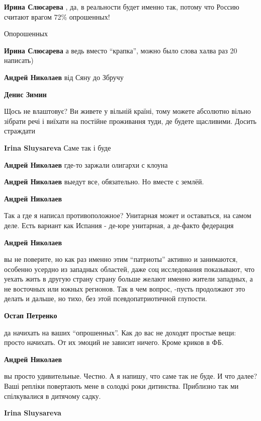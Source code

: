 \begin{itemize}
\begin{itemize}
\textbf{Ирина Слюсарева} , да, в реальности будет именно так, потому что Россию считают врагом 72\% опрошенных!

Опорошенных

\textbf{Ирина Слюсарева} а ведь вместо \enquote{крапка}, можно было слова халва раз 20 написать)

\textbf{Андрей Николаев} від Сяну до Збручу

\textbf{Денис Зимин} 

Щось не влаштовує? Ви живете у вільній країні, тому можете абсолютно вільно
зібрати речі і виїхати на постійне проживання туди, де будете щасливими. Досить
страждати


\textbf{Irina Sluysareva} Саме так і буде

\textbf{Андрей Николаев} где-то заржали олигархи с клоуна

\textbf{Андрей Николаев} выедут все, обязательно.
Но вместе с землёй.

\textbf{Андрей Николаев} 

Так а где я написал противоположное? Унитарная может и оставаться, на самом
деле. Есть вариант как Испания - де-юре унитарная, а де-факто федерация

\textbf{Андрей Николаев} 

вы не поверите, но как раз именно этим \enquote{патриоты} активно и занимаются,
особенно усердно из западных областей, даже соц исследования показывают, что
уехать жить в другую страну страну больше желают именно жители западных, а не
восточных или южных регионов. Так в чем вопрос, -пусть продолжают это делать и
дальше, но тихо, без этой псевдопатриотичной глупости.


\textbf{Остап Петренко} 

да начихать на ваших \enquote{опрошенных}. Как до вас не доходят простые вещи: просто
начихать. От их эмоций не зависит ничего. Кроме криков в ФБ.

\textbf{Андрей Николаев} 

вы просто удивительные. Честно. А я напишу, что саме так не буде. И что далее?
Ваші репліки повертають мене в солодкі роки дитинства. Приблизно так ми
спілкувалися в дитячому садку.

\textbf{Irina Sluysareva} 


\end{itemize}
\end{itemize}
